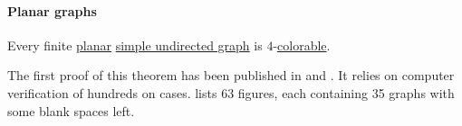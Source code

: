 \paragraph{Planar graphs}

\begin{theorem}\label{thm:four_color_theorem}
  Every finite \hyperref[def:graph_geometric_realization/planar]{planar} \hyperref[def:undirected_graph]{simple undirected graph} is \( 4 \)-\hyperref[def:graph_coloring/colorable]{colorable}.
\end{theorem}
\begin{comments}
  \item The first proof of this theorem has been published in \cite{AppelHaken1977Part1} and \cite{AppelHaken1977Part2}. It relies on computer verification of hundreds on cases. \cite{AppelHaken1977Part2} lists 63 figures, each containing 35 graphs with some blank spaces left.
\end{comments}
